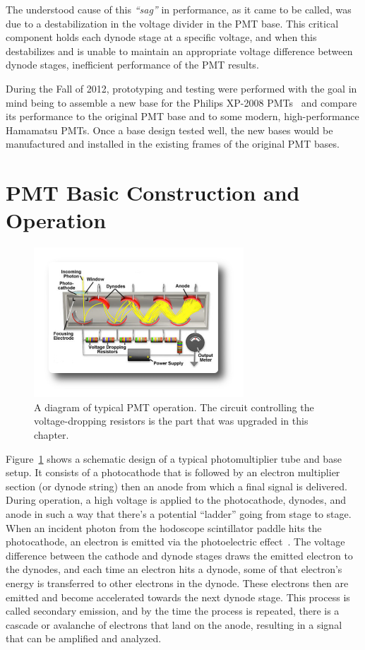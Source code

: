 The understood cause of this \emph{``sag''} in performance, as it came to be called, was due to a destabilization in the voltage divider in the PMT base. This critical component holds each dynode stage at a specific voltage, and when this destabilizes and is unable to maintain an appropriate voltage difference between dynode stages, inefficient performance of the PMT results.

During the Fall of 2012, prototyping and testing were performed with the goal in mind being to assemble a new base for the Philips XP-2008 PMTs~\cite{tubespecs} and compare its performance to the original PMT base and to some modern, high-performance Hamamatsu PMTs. Once a base design tested well, the new bases would be manufactured and installed in the existing frames of the original PMT bases.

\section{PMT Basic Construction and Operation}

\begin{figure}
	\centering
	\includegraphics[width=0.7\textwidth]{figures/pmtupgrade/pmt-diagram.png}
	\caption{A diagram of typical PMT operation. The circuit controlling the voltage-dropping resistors is the part that was upgraded in this chapter.}
	\label{fig:pmt}
\end{figure}

Figure~\ref{fig:pmt} shows a schematic design of a typical photomultiplier tube and base setup. It consists of a photocathode that is followed by an electron multiplier section (or dynode string) then an anode from which a final signal is delivered. During operation, a high voltage is applied to the photocathode, dynodes, and anode in such a way that there's a potential ``ladder'' going from stage to stage. When an incident photon from the hodoscope scintillator paddle hits the photocathode, an electron is emitted via the photoelectric effect~\cite{Einstein:1905cc}. The voltage difference between the cathode and dynode stages draws the emitted electron to the dynodes, and each time an electron hits a dynode, some of that electron's energy is transferred to other electrons in the dynode. These electrons then are emitted and become accelerated towards the next dynode stage. This process is called secondary emission, and by the time the process is repeated, there is a cascade or avalanche of electrons that land on the anode, resulting in a signal that can be amplified and analyzed.

